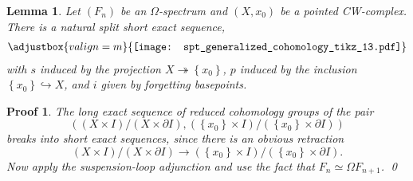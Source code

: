 \documentclass[sort&compress]{elsarticle}
\theoremstyle{theoremstyle}
\newtheorem{lem}[nul]{Lemma}
\theoremstyle{framedtheoremstyle}
\theoremstyle{definitionstyle}
\theoremstyle{definitionstyle}
\theoremstyle{definitionstyle}
\theoremstyle{definitionstyle}
\theoremstyle{nameddefinitionstyle}
\theoremstyle{framednameddefinitionstyle}
\theoremstyle{proofstyle}
\newtheorem{pf}{Proof}
\theoremstyle{definitionstyle}
\newcommand{\fromto}{\rightarrow}
\newcommand{\oneone}{\hookrightarrow}
\newcommand{\onto}{\twoheadrightarrow}
\newcommand{\homotopic}{\simeq}
\newcommand{\paren}[1]{\left( #1 \right)}
\newcommand{\angles}[1]{\left\langle #1 \right\rangle}
\newcommand{\brackets}[1]{\left[ #1 \right]}
\newcommand{\braces}[1]{\left\{ #1 \right\}}
\begin{document}
\begin{appendices}
\begin{lem}\label{lem:reduced_unreduced}
Let $(F_n)$ be an $\Omega$-spectrum and $\paren{X,x_0}$ be a pointed CW-complex. There is a natural split short exact sequence,
\begin{eqnarray}
\adjustbox{valign=m}{\texttt{[image: spt\_generalized\_cohomology\_tikz\_13.pdf]}}
\end{eqnarray}
with $s$ induced by the projection $X \onto \braces{x_0}$, $p$ induced by the inclusion $\braces{x_0} \oneone X$, and $i$ given by forgetting basepoints. 
\end{lem}

\begin{pf}
The long exact sequence of reduced cohomology groups of the pair
\begin{equation}
\paren{ \paren{X \times I}/\paren{X \times \partial I}, \paren{\braces{x_0} \times I}/\paren{\braces{x_0} \times \partial I} }
\end{equation}
breaks into short exact sequences, since there is an obvious retraction
\begin{equation}
\paren{X \times I}/\paren{X \times \partial I} \fromto \paren{\braces{x_0} \times I}/\paren{\braces{x_0} \times \partial I}.
\end{equation}
Now apply the suspension-loop adjunction and use the fact that $F_n \homotopic \Omega F_{n+1}$.
\qed\end{pf}


\end{appendices}
\end{document}
